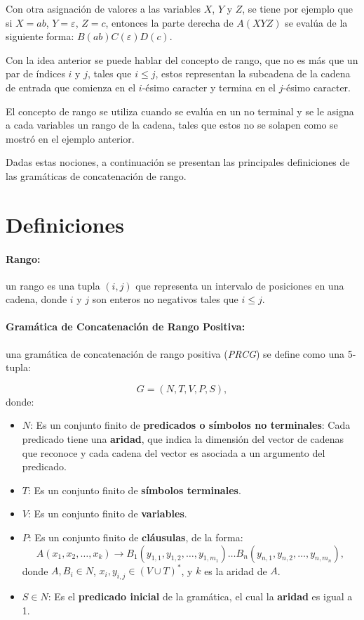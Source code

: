 \documentclass[12pt]{article}
\begin{document}
Con otra asignación de valores a las variables $X$, $Y$ y $Z$, se tiene por ejemplo que si $X=ab$, $Y = \varepsilon$, $Z=c$,
entonces la parte derecha de $A(XYZ)$ se evalúa de la siguiente forma: $B(ab)C(\varepsilon) D(c)$.

Con la idea anterior se puede hablar del concepto de rango, que no es más que un par de índices $i$ y $j$, tales que $i\leq j$, estos
representan la subcadena de la cadena de entrada que comienza en el $i$-ésimo caracter y termina en el $j$-ésimo caracter.

El concepto de rango se utiliza cuando se evalúa en un no terminal y se le asigna a cada variables un rango de la cadena, tales
que estos no se solapen como se mostró en el ejemplo anterior.

Dadas estas nociones, a continuación se presentan las principales definiciones de las gramáticas de concatenación de rango.

\section{Definiciones}

\paragraph{Rango:} un rango es una tupla $(i, j)$ que representa un intervalo de posiciones en una cadena, donde $i$ y $j$ son enteros no negativos tales que $i \leq j$.

\paragraph{Gramática de Concatenación de Rango Positiva:} una gramática de concatenación de rango positiva (\textit{PRCG}) se define como una 5-tupla:

\[
    G = (N, T, V, P, S),
\]
donde:

\begin{itemize}
    \item $N$: Es un conjunto finito de \textbf{predicados o símbolos no terminales}: Cada predicado tiene una \textbf{aridad}, que indica la dimensión del vector de cadenas que reconoce y cada cadena del vector es asociada a un argumento del predicado.
    \item $T$: Es un conjunto finito de \textbf{símbolos terminales}.
    \item $V$: Es un conjunto finito de \textbf{variables}.
    \item $P$: Es un conjunto finito de \textbf{cláusulas}, de la forma:
          \[
              A(x_1, x_2, \ldots, x_k) \to B_1(y_{1,1}, y_{1,2}, \ldots, y_{1,m_1}) \ldots B_n(y_{n,1}, y_{n,2}, \ldots, y_{n,m_n}),
          \]
          donde $A, B_i \in N$, $x_i, y_{i,j} \in (V \cup T)^*$, y $k$ es la aridad de $A$.
    \item $S \in N$: Es el \textbf{predicado inicial} de la gramática, el cual la \textbf{aridad} es igual a 1.
\end{itemize}
\end{document}
